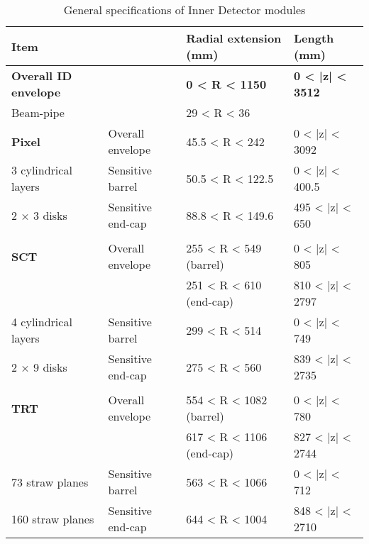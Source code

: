 \begin{table} \centering
\caption{General specifications of Inner Detector modules \cite{atlas_tdr}}
\label{tab:ID_specs}
\begin{tabular}{ |l l|l|l| }
    \hline
    \textbf{Item}                   & &       \textbf{Radial extension (mm)} & \textbf{Length (mm)} \\
    \hline
    \textbf{Overall ID envelope}    & &         \textbf{0 < R < 1150}        &\textbf{0 < |z| < 3512} \\
    Beam-pipe                       & &            29 < R < 36    & \\
    \hline
    \textbf{Pixel}        &  Overall envelope  &  45.5 < R < 242           &  0 < |z| < 3092 \\
    3 cylindrical layers  &  Sensitive barrel  &  50.5 < R < 122.5         &  0 < |z| < 400.5 \\
    2 × 3 disks           &  Sensitive end-cap &  88.8 < R < 149.6         &  495 < |z| < 650 \\
    &&&\\
    \textbf{SCT}          &  Overall envelope  &  255 < R < 549 (barrel)   &  0 < |z| < 805 \\
                          &                    &  251 < R < 610 (end-cap)  &  810 < |z| < 2797 \\
    4 cylindrical layers  &  Sensitive barrel  &  299 < R < 514            &  0 < |z| < 749 \\
    2 × 9 disks           &  Sensitive end-cap &  275 < R < 560            &  839 < |z| < 2735 \\
    &&&\\
    \textbf{TRT}          &  Overall envelope  &  554 < R < 1082 (barrel)  &  0 < |z| < 780 \\
                          &                    &  617 < R < 1106 (end-cap) &  827 < |z| < 2744 \\
    73 straw planes       &  Sensitive barrel  &  563 < R < 1066           &  0 < |z| < 712 \\
    160 straw planes      &  Sensitive end-cap &  644 < R < 1004           &  848 < |z| < 2710 \\
    \hline
\end{tabular} \end{table}
